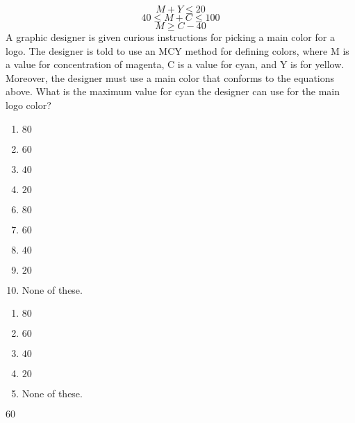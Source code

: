  
$$M+Y\leq 20$$
$$40 \leq M+C \leq 100 $$
$$M \geq C-40 $$
A graphic designer is given curious instructions for picking a main color for a logo.  The designer is told to use an MCY method for defining colors, where M is a value for concentration of magenta, C is a value for cyan, and Y is for yellow.  Moreover, the designer must use a main color that conforms to the equations above.  What is the maximum value for cyan the designer can use for the main logo color?


\ifsat
	\begin{enumerate}[label=\Alph*)]
		\item $80 $ 
		\item $60 $ %
		\item $40 $ 
		\item $20 $
	\end{enumerate}
\else
\fi

\ifacteven
	\begin{enumerate}[label=\textbf{\Alph*.},itemsep=\fill,align=left]
		\setcounter{enumii}{5}
		\item $80 $ 
		\item $60 $ %
		\item $40 $ 
		\addtocounter{enumii}{1}
		\item $20 $
		\item None of these. 
	\end{enumerate}
\else
\fi

\ifactodd
	\begin{enumerate}[label=\textbf{\Alph*.},itemsep=\fill,align=left]
		\item $80 $ 
		\item $60 $ %
		\item $40 $ 
		\item $20 $
		\item None of these. 
	\end{enumerate}
\else
\fi

\ifgridin
 $60 $ %
		
\else
\fi

